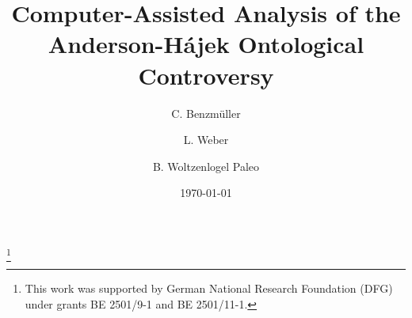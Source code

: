 \documentclass{birkjour}
\theoremstyle{definition}
\theoremstyle{remark}
\numberwithin{equation}{section}
\begin{document}
%
%
%
%
%
%
%
%
%


\title[The Anderson-Hájek Ontological Controversy]
{Computer-Assisted Analysis of the \\ 
Anderson-Hájek Ontological Controversy}



\author[Benzm\"uller]{C. Benzm\"uller}

\address{%
Dep.~of Mathematics and Computer Science, Freie Universit\"at Berlin, Germany
}

\thanks{This work was supported by German National Research Foundation (DFG) under
 grants BE 2501/9-1 and BE 2501/11-1.}


\author[Weber]{L. Weber}
\address{ 
Dep.~of Mathematics and Computer Science, Freie Universit\"at Berlin, Germany
}


\author[Woltzenlogel-Paleo]{B. Woltzenlogel Paleo}
\address{ 
Room HA0402, Favoritenstra{\ss}e 9, 1040 Wien, Austria
}






\date{\today}
\dedicatory{ }


\maketitle
\end{document}

